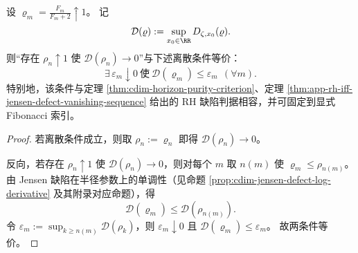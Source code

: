 \begin{conclusion}\label{con:cdim-rh-defect-fibonacci-discretization}
设 \(\varrho_m=\frac{F_m}{F_m+2}\uparrow 1\)。
记
\[
\mathcal D(\varrho):=\sup_{x_0\in\RR}D_{\zeta,x_0}(\varrho).
\]
则“存在 \(\rho_n\uparrow 1\) 使 \(\mathcal D(\rho_n)\to 0\)”与下述离散条件等价：
\[
\exists\,\varepsilon_m\downarrow 0\ \text{使}\ \mathcal D(\varrho_m)\le \varepsilon_m\ \ (\forall m).
\]
特别地，该条件与定理 \ref{thm:cdim-horizon-purity-criterion}、定理 \ref{thm:app-rh-iff-jensen-defect-vanishing-sequence} 给出的 RH 缺陷判据相容，并可固定到显式 Fibonacci 索引。
\end{conclusion}
\begin{proof}
若离散条件成立，则取 \(\rho_n:=\varrho_n\) 即得 \(\mathcal D(\rho_n)\to 0\)。

反向，若存在 \(\rho_n\uparrow 1\) 使 \(\mathcal D(\rho_n)\to 0\)，则对每个 \(m\) 取 \(n(m)\) 使 \(\varrho_m\le \rho_{n(m)}\)。
由 Jensen 缺陷在半径参数上的单调性（见命题 \ref{prop:cdim-jensen-defect-log-derivative} 及其附录对应命题），得
\[
\mathcal D(\varrho_m)\le \mathcal D(\rho_{n(m)}).
\]
令 \(\varepsilon_m:=\sup_{k\ge n(m)}\mathcal D(\rho_k)\)，则 \(\varepsilon_m\downarrow 0\) 且 \(\mathcal D(\varrho_m)\le\varepsilon_m\)。
故两条件等价。
\end{proof}

